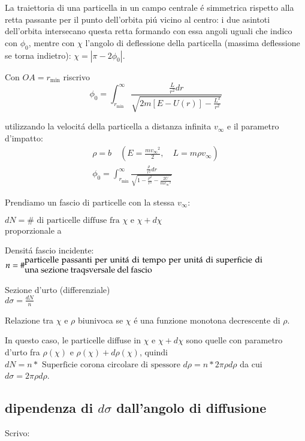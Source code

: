\documentclass[main.tex]{subfiles}
\begin{document}
La traiettoria di una particella in un campo centrale \'e  simmetrica rispetto alla retta passante per il punto dell'orbita pi\'u vicino al centro: i due asintoti dell'orbita intersecano questa retta formando con essa angoli uguali che indico con $\phi_0$, mentre con $\chi$ l'angolo di deflessione della particella (massima deflessione se torna indietro):
$\chi=|\pi-2\phi_0|$. 

Con $OA=r_{\text{min}}$ riscrivo
\begin{equation*}
\phi_0=\int_{r_{\text{min}}}^{\infty}\frac{\frac{L}{r^2}dr}{\sqrt{2m[E-U(r)]-\frac{L^2}{r^2}}}
\end{equation*}

utilizzando la velocit\'a della particella a distanza infinita $v_{\infty}$ e il parametro d'impatto:
\begin{align*}
\rho=b\quad (E=\frac{m{v_{\infty}}^2}{2},\quad L=m\rho v_{\infty})\\
\phi_0=\int_{r_{\text{min}}}^{\infty}\frac{\frac{\rho}{r^2}dr}{\sqrt{1-\frac{\rho^2}{r^2}-\frac{2U}{m{v_{\infty}}^2}}}
\end{align*}



Prendiamo un fascio di particelle con la stessa $v_{\infty}$:
\begin{itemize*}
\item $dN=\#\text{ di particelle diffuse fra }\chi\text{ e }\chi+d\chi$\\
proporzionale a
\item Densit\'a fascio incidente:\\
 $n=\#\parbox{10cm}{ particelle passanti per unit\'a di tempo per unit\'a di superficie di una sezione traqsversale del fascio}$

\item Sezione d'urto (differenziale)\\
$d\sigma=\frac{dN}{n}$
\end{itemize*}

Relazione tra $\chi$ e $\rho$ biunivoca se $\chi$ \'e una funzione monotona decrescente di $\rho$.

In questo caso,
le particelle diffuse in $\chi$ e $\chi+d\chi$ sono quelle con parametro d'urto fra $\rho(\chi)$ e $\rho(\chi)+d\rho(\chi)$, quindi\\
$dN=n*\text{ Superficie corona circolare di spessore }d\rho=n*2\pi\rho d\rho$ da cui $d\sigma=2\pi\rho d\rho$.

\subsection{dipendenza di $d\sigma$ dall'angolo di diffusione} Scrivo:
\end{document}

